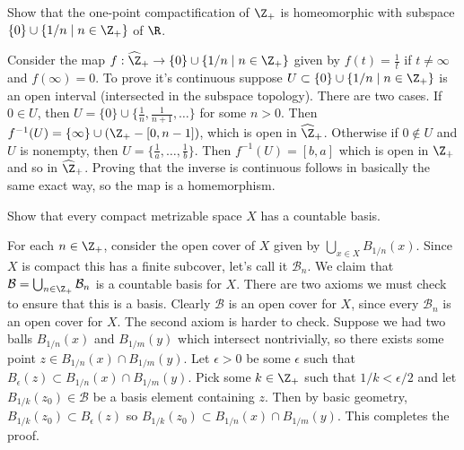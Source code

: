 \documentclass[11pt,letterpaper]{article}
\begin{document}
\begin{problem}
    Show that the one-point compactification of $\Z_+$ is homeomorphic with subspace $\{0\}\cup \{1 /n \mid n\in \Z_+\}$ of $\R$. 
\end{problem}

\begin{solution}
    Consider the map $f :\widehat{\Z}_+ \to \{0\}\cup\{1 /n \mid n\in \Z_+\}$ given by $f(t)= \frac{1}{t}$ if $t\neq \infty$ and $f(\infty)=0$.  To prove it's continuous suppose $U\subset \{0\}\cup\{1 /n\mid n\in \Z_+\}$ is an open interval (intersected in the subspace topology). There are two cases. If $0\in U$, then $U=\{0\}\cup \{\frac{1}{n},\frac{1}{n+1},\ldots\}$ for some $n>0$. Then $f^{-1}(U)=\{\infty\}\cup (\Z_+ - [0, n-1])$, which is open in $\widehat{\Z}_+$. Otherwise if $0\not\in U$ and $U$ is nonempty, then $U=\{\frac{1}{a}, \ldots, \frac{1}{b}\}$. Then $f^{-1}(U)=[b,a]$ which is open in $\Z_+$ and so in $\widehat{\Z}_+$. Proving that the inverse is continuous follows in basically the same exact way, so the map is a homemorphism. 
\end{solution}


\begin{problem}
    Show that every compact metrizable space $X$ has a countable basis.
\end{problem}

\begin{solution}
    For each $n\in \Z_+$, consider the open cover of $X$ given by $\bigcup_{x\in X} B_{1 /n}(x)$. Since $X$ is compact this has a finite subcover, let's call it $\mathcal{B}_n$. We claim that $\mathcal{B}=\bigcup_{n\in \Z_+}\mathcal{B}_n$ is a countable basis for $X$. There are two axioms we must check to ensure that this is a basis. Clearly $\mathcal{B}$ is an open cover for $X$, since every $\mathcal{B}_n$ is an open cover for $X$. The second axiom is harder to check. Suppose we had two balls $B_{1 /n}(x)$ and $B_{1 /m}(y)$ which intersect nontrivially, so there exists some point $z\in B_{1 /n}(x)\cap B_{1 /m}(y)$. Let $\epsilon>0$ be some $\epsilon$ such that $B_{\epsilon}(z)\subset B_{1 /n}(x)\cap B_{1 /m}(y)$. Pick some $k\in \Z_+$ such that $1 /k < \epsilon /2$ and let $B_{1 /k}(z_0)\in \mathcal{B}$ be a basis element containing $z$. Then by basic geometry, $B_{1 /k}(z_0)\subset B_{\epsilon}(z)$ so $B_{1 /k}(z_0)\subset B_{1 /n}(x)\cap B_{1 /m}(y)$. This completes the proof. 
\end{solution}
\end{document}
